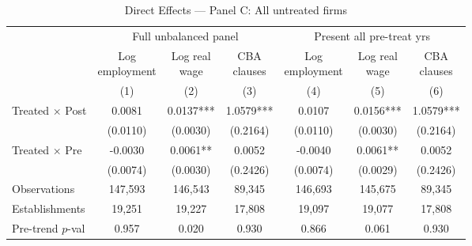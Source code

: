 \begin{table}[H]
\centering
\scriptsize
\caption{Direct Effects — Panel C: All untreated firms}
\begin{tabular}{lcccccc}
\toprule
& \multicolumn{3}{c}{Full unbalanced panel} & \multicolumn{3}{c}{Present all pre-treat yrs} \\
\cmidrule(lr){2-4} \cmidrule(lr){5-7}
& \shortstack{Log\\employment} & \shortstack{Log real\\wage} & \shortstack{CBA\\clauses} & \shortstack{Log\\employment} & \shortstack{Log real\\wage} & \shortstack{CBA\\clauses} \\
& (1) & (2) & (3) & (4) & (5) & (6) \\
\midrule
Treated $\times$ Post & 0.0081 & 0.0137*** & 1.0579*** & 0.0107 & 0.0156*** & 1.0579*** \\
& (0.0110) & (0.0030) & (0.2164) & (0.0110) & (0.0030) & (0.2164) \\[3pt]
Treated $\times$ Pre & -0.0030 & 0.0061** & 0.0052 & -0.0040 & 0.0061** & 0.0052 \\
& (0.0074) & (0.0030) & (0.2426) & (0.0074) & (0.0029) & (0.2426) \\[3pt]
\midrule
Observations & 147,593 & 146,543 & 89,345 & 146,693 & 145,675 & 89,345 \\
Establishments & 19,251 & 19,227 & 17,808 & 19,097 & 19,077 & 17,808 \\
Pre-trend $p$-val & 0.957 & 0.020 & 0.930 & 0.866 & 0.061 & 0.930 \\
\bottomrule
\end{tabular}
\begin{minipage}{\textwidth}
\footnotesize
\medskip

\end{minipage}
\end{table}
